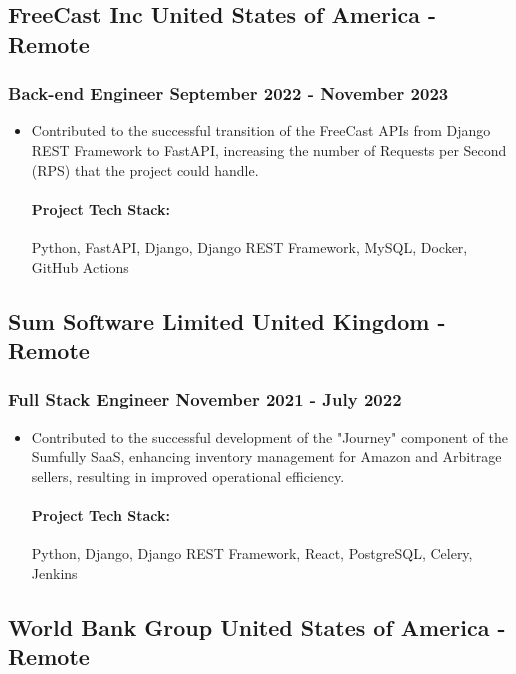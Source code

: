 \documentclass[11pt]{article} %
\begin{document}
\subsection{FreeCast Inc \hfill United States of America - Remote}
\subsubsection{Back-end Engineer \hfill  September 2022 - November 2023}
\begin{itemize}
    \item Contributed to the successful transition of the FreeCast APIs from Django REST Framework to FastAPI, increasing the number of Requests per Second (RPS) that the project could handle.

    \paragraph{Project Tech Stack:} Python, FastAPI, Django, Django REST Framework, MySQL, Docker, GitHub Actions
\end{itemize}

\subsection{Sum Software Limited \hfill United Kingdom - Remote}
\subsubsection{Full Stack Engineer \hfill  November 2021 - July 2022}
\begin{itemize}
    \item Contributed to the successful development of the "Journey" component of the Sumfully SaaS, enhancing inventory management for Amazon and Arbitrage sellers, resulting in improved operational efficiency.

    \paragraph{Project Tech Stack:} Python, Django, Django REST Framework, React, PostgreSQL, Celery, Jenkins
\end{itemize}


\subsection{World Bank Group \hfill United States of America - Remote}
\end{document}
